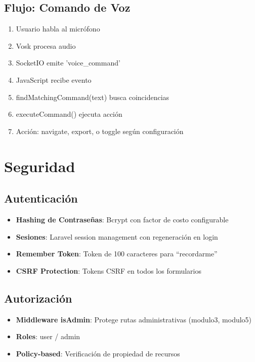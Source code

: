 \subsection{Flujo: Comando de Voz}

\begin{enumerate}
    \item Usuario habla al micrófono
    \item Vosk procesa audio
    \item SocketIO emite 'voice\_command'
    \item JavaScript recibe evento
    \item findMatchingCommand(text) busca coincidencias
    \item executeCommand() ejecuta acción
    \item Acción: navigate, export, o toggle según configuración
\end{enumerate}

\newpage

\section{Seguridad}

\subsection{Autenticación}

\begin{itemize}
    \item \textbf{Hashing de Contraseñas}: Bcrypt con factor de costo configurable
    \item \textbf{Sesiones}: Laravel session management con regeneración en login
    \item \textbf{Remember Token}: Token de 100 caracteres para ``recordarme''
    \item \textbf{CSRF Protection}: Tokens CSRF en todos los formularios
\end{itemize}

\subsection{Autorización}

\begin{itemize}
    \item \textbf{Middleware isAdmin}: Protege rutas administrativas (modulo3, modulo5)
    \item \textbf{Roles}: user / admin
    \item \textbf{Policy-based}: Verificación de propiedad de recursos
\end{itemize}

